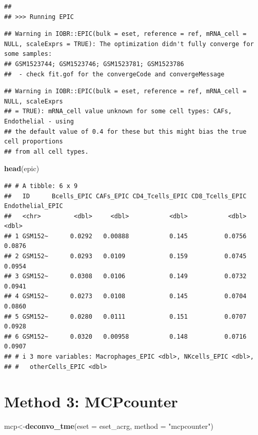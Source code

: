 \documentclass[
  12pt,
]{book}
\newenvironment{Shaded}{\begin{snugshade}}{\end{snugshade}}
\newcommand{\AttributeTok}[1]{\textcolor[rgb]{0.13,0.29,0.53}{#1}}
\newcommand{\FunctionTok}[1]{\textcolor[rgb]{0.13,0.29,0.53}{\textbf{#1}}}
\newcommand{\NormalTok}[1]{#1}
\newcommand{\OtherTok}[1]{\textcolor[rgb]{0.56,0.35,0.01}{#1}}
\newcommand{\StringTok}[1]{\textcolor[rgb]{0.31,0.60,0.02}{#1}}
\begin{document}
\begin{verbatim}
## 
## >>> Running EPIC
\end{verbatim}

\begin{verbatim}
## Warning in IOBR::EPIC(bulk = eset, reference = ref, mRNA_cell = NULL, scaleExprs = TRUE): The optimization didn't fully converge for some samples:
## GSM1523744; GSM1523746; GSM1523781; GSM1523786
##  - check fit.gof for the convergeCode and convergeMessage
\end{verbatim}

\begin{verbatim}
## Warning in IOBR::EPIC(bulk = eset, reference = ref, mRNA_cell = NULL, scaleExprs
## = TRUE): mRNA_cell value unknown for some cell types: CAFs, Endothelial - using
## the default value of 0.4 for these but this might bias the true cell proportions
## from all cell types.
\end{verbatim}

\begin{Shaded}
\begin{Highlighting}[]
\FunctionTok{head}\NormalTok{(epic)}
\end{Highlighting}
\end{Shaded}

\begin{verbatim}
## # A tibble: 6 x 9
##   ID      Bcells_EPIC CAFs_EPIC CD4_Tcells_EPIC CD8_Tcells_EPIC Endothelial_EPIC
##   <chr>         <dbl>     <dbl>           <dbl>           <dbl>            <dbl>
## 1 GSM152~      0.0292   0.00888           0.145          0.0756           0.0876
## 2 GSM152~      0.0293   0.0109            0.159          0.0745           0.0954
## 3 GSM152~      0.0308   0.0106            0.149          0.0732           0.0941
## 4 GSM152~      0.0273   0.0108            0.145          0.0704           0.0860
## 5 GSM152~      0.0280   0.0111            0.151          0.0707           0.0928
## 6 GSM152~      0.0320   0.00958           0.148          0.0716           0.0907
## # i 3 more variables: Macrophages_EPIC <dbl>, NKcells_EPIC <dbl>,
## #   otherCells_EPIC <dbl>
\end{verbatim}

\hypertarget{method-3-mcpcounter}{%
\section{Method 3: MCPcounter}\label{method-3-mcpcounter}}

\begin{Shaded}
\begin{Highlighting}[]
\NormalTok{mcp}\OtherTok{\textless{}{-}}\FunctionTok{deconvo\_tme}\NormalTok{(}\AttributeTok{eset =}\NormalTok{ eset\_acrg, }\AttributeTok{method =} \StringTok{"mcpcounter"}\NormalTok{)}
\end{Highlighting}
\end{Shaded}
\end{document}
